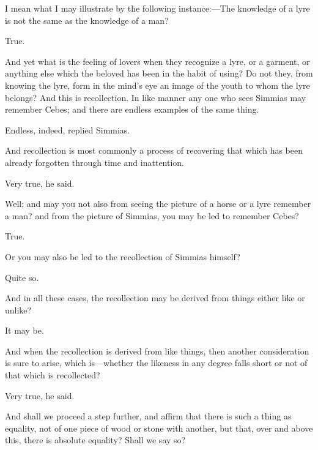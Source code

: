 \documentclass[11pt,letter]{article}
\begin{document}
\par  I mean what I may illustrate by the following instance:—The knowledge of a lyre is not the same as the knowledge of a man?

\par  True.

\par  And yet what is the feeling of lovers when they recognize a lyre, or a garment, or anything else which the beloved has been in the habit of using? Do not they, from knowing the lyre, form in the mind's eye an image of the youth to whom the lyre belongs? And this is recollection. In like manner any one who sees Simmias may remember Cebes; and there are endless examples of the same thing.

\par  Endless, indeed, replied Simmias.

\par  And recollection is most commonly a process of recovering that which has been already forgotten through time and inattention.

\par  Very true, he said.

\par  Well; and may you not also from seeing the picture of a horse or a lyre remember a man? and from the picture of Simmias, you may be led to remember Cebes?

\par  True.

\par  Or you may also be led to the recollection of Simmias himself?

\par  Quite so.

\par  And in all these cases, the recollection may be derived from things either like or unlike?

\par  It may be.

\par  And when the recollection is derived from like things, then another consideration is sure to arise, which is—whether the likeness in any degree falls short or not of that which is recollected?

\par  Very true, he said.

\par  And shall we proceed a step further, and affirm that there is such a thing as equality, not of one piece of wood or stone with another, but that, over and above this, there is absolute equality? Shall we say so?
\end{document}
